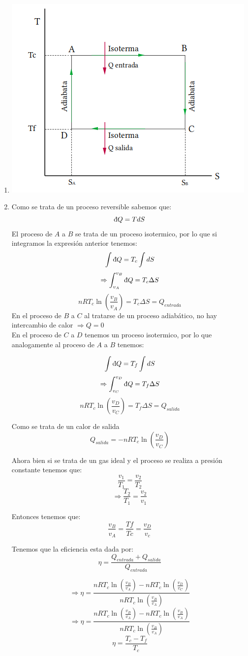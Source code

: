 \begin{enumerate}
    \item  \includegraphics*[H]{T-S.png}
    \item  Como se trata de un proceso reversible  sabemos que:
    \[ \dbar Q =TdS \]
   El proceso de $A$ a $B$ se trata de un proceso isotermico, por lo que si integramos la expresión anterior tenemos:
   \[ \int \dbar Q =T_{c}\int dS \]
   \[ \Rightarrow \int _{v_A} ^{v_B} \dbar Q = T_{c} \Delta S\]
   \[nRT_c \ln \left( \frac{v_B}{v_A}\right) = T_{c}\Delta S = Q_{entrada}\]
    En el proceso de $B$ a $C$ al tratarse de un proceso adiabático, no hay intercambio de calor $\Rightarrow Q=0$\\

    En  el proceso de $C$ a $D$ tenemos un proceso isotermico, por lo que analogamente al proceso de $A$ a $B$ tenemos:

\[ \int \dbar Q =T_{f}\int dS \]
   \[ \Rightarrow \int_{v_C} ^ {v_D} \dbar Q = T_{f} \Delta S\]
   \[nRT_c \ln \left( \frac{v_D}{v_C}\right) = T_{f}\Delta S = Q_{salida}\]

Como se trata de un calor de salida 
\[Q_{salida}=-nRT_c \ln \left( \frac{v_D}{v_C}\right)\]
  

   Ahora bien si  se trata de un gas ideal y el proceso se realiza a presión constante tenemos que:
   \[ \frac{v_1}{T_1}=\frac{v_2}{T_2}\]
   \[\Rightarrow \frac{T_2}{T_1}=\frac{v_2}{v_1}\]

Entonces tenemos que:
\[ \frac{v_B}{v_A}=\frac{Tf}{Tc}=\frac{v_D}{v_c}\]

Tenemos que la eficiencia esta dada por:
\[ \eta = \frac{Q_{entrada}+ Q_{salida}}{Q_{entrada}}\]

\[\Rightarrow  \eta = \frac{nRT_c \ln \left( \frac{v_B}{v_A}\right)-nRT_c \ln \left( \frac{v_D}{v_C}\right)}{nRT_c \ln \left( \frac{v_B}{v_A}\right)}\]
\[\Rightarrow  \eta = \frac{nRT_c \ln \left( \frac{v_B}{v_A}\right)-nRT_c \ln \left( \frac{v_B}{v_A}\right)}{nRT_c \ln \left( \frac{v_B}{v_A}\right)}\]
\[\eta =\frac{T_c-T_f}{T_c}\]





\end{enumerate}
